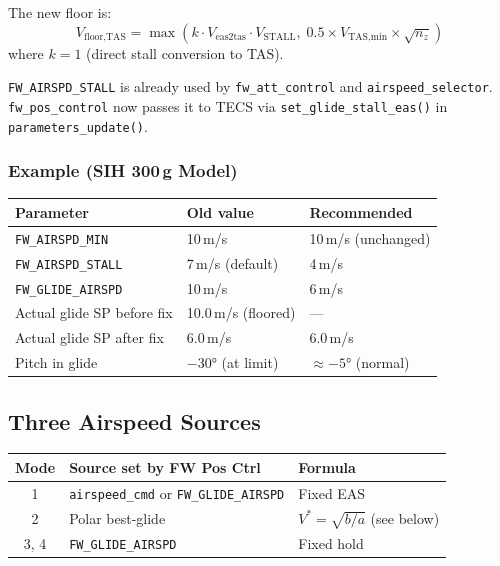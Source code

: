\documentclass[12pt,a4paper]{article}
\begin{document}
The new floor is:
\begin{equation}
  V_{\text{floor,TAS}} = \max\!\left(
      k \cdot V_{\text{eas2tas}} \cdot V_{\text{STALL}},\;
      0.5 \times V_{\text{TAS,min}} \times \sqrt{n_z}
  \right)
\end{equation}
where $k = 1$ (direct stall conversion to TAS).

\texttt{FW\_AIRSPD\_STALL} is already used by \texttt{fw\_att\_control} and
\texttt{airspeed\_selector}. \texttt{fw\_pos\_control} now passes it to TECS
via \texttt{set\_glide\_stall\_eas()} in \texttt{parameters\_update()}.

\subsubsection{Example (SIH 300\,g Model)}

\begin{center}
\begin{tabular}{lll}\toprule
Parameter & Old value & Recommended \\
\midrule
\texttt{FW\_AIRSPD\_MIN} & 10\,m/s & 10\,m/s (unchanged) \\
\texttt{FW\_AIRSPD\_STALL} & 7\,m/s (default) & 4\,m/s \\
\texttt{FW\_GLIDE\_AIRSPD} & 10\,m/s & 6\,m/s \\
Actual glide SP before fix & 10.0\,m/s (floored) & --- \\
Actual glide SP after fix  & 6.0\,m/s & 6.0\,m/s \\
Pitch in glide & $-30°$ (at limit) & $\approx -5°$ (normal) \\
\bottomrule
\end{tabular}
\end{center}

\subsection{Three Airspeed Sources}

\begin{center}
\begin{tabular}{cll}
\toprule
Mode & Source set by FW Pos Ctrl & Formula \\
\midrule
1 & \texttt{airspeed\_cmd} or \texttt{FW\_GLIDE\_AIRSPD} & Fixed EAS \\
2 & Polar best-glide & $V^* = \sqrt{b/a}$ (see below) \\
3, 4 & \texttt{FW\_GLIDE\_AIRSPD} & Fixed hold \\
\bottomrule
\end{tabular}
\end{center}
\end{document}
